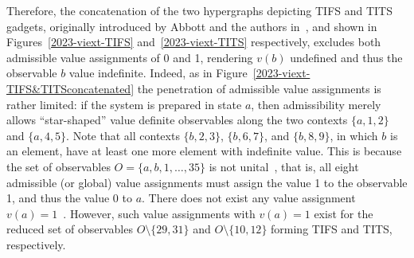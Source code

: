 \documentclass[%
 reprint,
 superscriptaddress,
 showpacs,
 showkeys,
 nofootinbib,
  amsmath,amssymb,
 pra,
  longbibliography,
  floatfix,
 ]{revtex4-2}
\theoremstyle{definition}
\begin{document}
Therefore, the concatenation of the two hypergraphs depicting TIFS and TITS gadgets,
originally introduced by Abbott and the authors in~\cite{2018-minimalYIYS}, and
shown in Figures~\ref{2023-viext-TIFS} and~\ref{2023-viext-TITS} respectively, excludes both admissible value assignments of 0 and 1,
rendering $v(b)$ undefined and thus the observable $b$ value indefinite.
Indeed, as in Figure~\ref{2023-viext-TIFS&TITSconcatenated}
the penetration of admissible value assignments is rather limited: if the system is prepared in state $a$, then admissibility merely allows
``star-shaped'' value definite observables along the two contexts $\{a,1,2\}$ and $\{a,4,5\}$.
Note that all contexts
$\{b,2,3\}$,
$\{b,6,7\}$, and
$\{b,8,9\}$,
in which $b$ is an element, have at least one more element with indefinite value.
This is because
the set of observables $O=\{ a,b, 1,\ldots , 35\}$ is not unital~\cite{svozil-tkadlec}, that is, all eight admissible (or global) value assignments must assign the value 1 to the observable 1,
and thus the value 0 to $a$.
There does not exist any value assignment  $v(a)=1$~\cite[Table~24.1]{Svozil-2018-p}.
However, such value assignments with  $v(a)=1$ exist for the reduced set of observables
$O  \setminus \{29,31\}$
and
$O  \setminus \{10,12\}$
forming TIFS and TITS, respectively.
\end{document}
